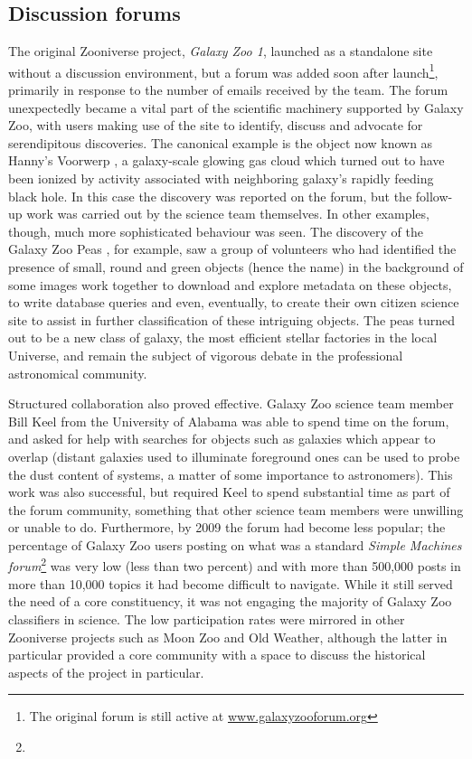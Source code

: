 \documentclass{sigchi}
\begin{document}
\subsection{Discussion forums}


The original Zooniverse project, \emph{Galaxy Zoo 1}, launched as a standalone site without a discussion environment, but a forum was added soon after launch\footnote{The original forum is still active at \url{www.galaxyzooforum.org}}, primarily in response to the number of emails received by the team. The forum unexpectedly became a vital part of the scientific machinery supported by Galaxy Zoo, with users making use of the site to identify, discuss and advocate for serendipitous discoveries. The canonical example is the object now known as Hanny's Voorwerp \cite{voorwerp}, a galaxy-scale glowing gas cloud which turned out to have been ionized by activity associated with neighboring galaxy's rapidly feeding black hole. In this case the discovery was reported on the forum, but the follow-up work was carried out by the science team themselves. In other examples, though, much more sophisticated behaviour was seen. The discovery of the Galaxy Zoo Peas \cite{Peas}, for example, saw a group of volunteers who had identified the presence of small, round and green objects (hence the name) in the background of some images work together to download and explore metadata on these objects, to write database queries and even, eventually, to create their own citizen science site to assist in further classification of these intriguing objects. The peas turned out to be a new class of galaxy, the most efficient stellar factories in the local Universe, and remain the subject of vigorous debate in the professional astronomical community. 

Structured collaboration also proved effective. Galaxy Zoo science team member Bill Keel from the University of Alabama was able to spend time on the forum, and asked for help with searches for objects such as galaxies which appear to overlap \cite{overlap} (distant galaxies used to illuminate foreground ones can be used to probe the dust content of systems, a matter of some importance to astronomers). This work was also successful, but required Keel to spend substantial time as part of the forum community, something that other science team members were unwilling or unable to do. Furthermore, by 2009 the forum had become less popular; the percentage of Galaxy Zoo users posting on what was a standard \emph{Simple Machines forum}\footnote{} was very low (less than two percent) and with more than 500,000 posts in more than 10,000 topics it had become difficult to navigate. While it still served the need of a core constituency, it was not engaging the majority of Galaxy Zoo classifiers in science. The low participation rates were mirrored in other Zooniverse projects such as Moon Zoo and Old Weather, although the latter in particular provided a core community with a space to discuss the historical aspects of the project in particular.
\end{document}
